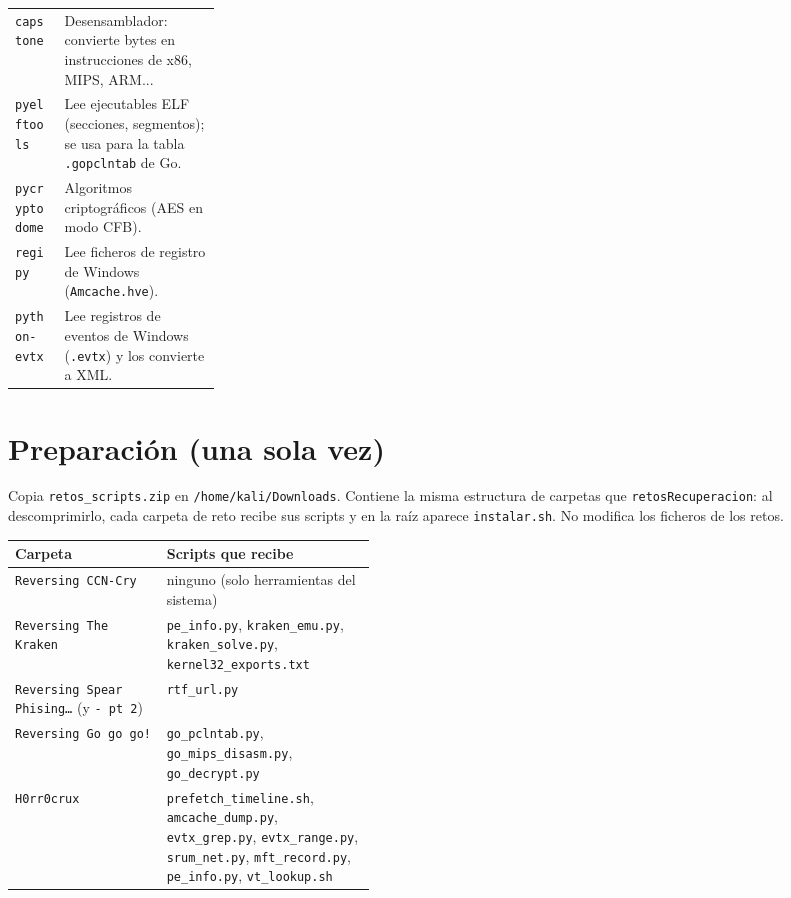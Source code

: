 \documentclass[11pt,a4paper]{article}
\begin{document}
\begin{tabularx}{\linewidth}{@{}>{\raggedright\arraybackslash}p{0.24\linewidth}X@{}}
\texttt{capstone} & Desensamblador: convierte bytes en instrucciones de x86, MIPS, ARM... \\
\texttt{pyelftools} & Lee ejecutables ELF (secciones, segmentos); se usa para la tabla \texttt{.gopclntab} de Go. \\
\texttt{pycryptodome} & Algoritmos criptográficos (AES en modo CFB). \\
\texttt{regipy} & Lee ficheros de registro de Windows (\texttt{Amcache.hve}). \\
\texttt{python-evtx} & Lee registros de eventos de Windows (\texttt{.evtx}) y los convierte a XML. \\
\bottomrule
\end{tabularx}


\section{Preparación (una sola vez)}
Copia \texttt{retos\_scripts.zip} en \texttt{/home/kali/Downloads}. Contiene la misma estructura de carpetas que
\texttt{retosRecuperacion}: al descomprimirlo, cada carpeta de reto recibe sus scripts y en la raíz aparece
\texttt{instalar.sh}. No modifica los ficheros de los retos.

\begin{tabularx}{\linewidth}{@{}>{\raggedright\arraybackslash}p{0.42\linewidth}X@{}}
\toprule
\textbf{Carpeta} & \textbf{Scripts que recibe} \\ \midrule
\texttt{Reversing CCN-Cry} & ninguno (solo herramientas del sistema) \\
\texttt{Reversing The Kraken} & \texttt{pe\_info.py}, \texttt{kraken\_emu.py}, \texttt{kraken\_solve.py}, \texttt{kernel32\_exports.txt} \\
\texttt{Reversing Spear Phising\dots{}} (y \texttt{- pt 2}) & \texttt{rtf\_url.py} \\
\texttt{Reversing Go go go!} & \texttt{go\_pclntab.py}, \texttt{go\_mips\_disasm.py}, \texttt{go\_decrypt.py} \\
\texttt{H0rr0crux} & \texttt{prefetch\_timeline.sh}, \texttt{amcache\_dump.py}, \texttt{evtx\_grep.py}, \texttt{evtx\_range.py},
  \texttt{srum\_net.py}, \texttt{mft\_record.py}, \texttt{pe\_info.py}, \texttt{vt\_lookup.sh} \\
\bottomrule
\end{tabularx}
\end{document}
